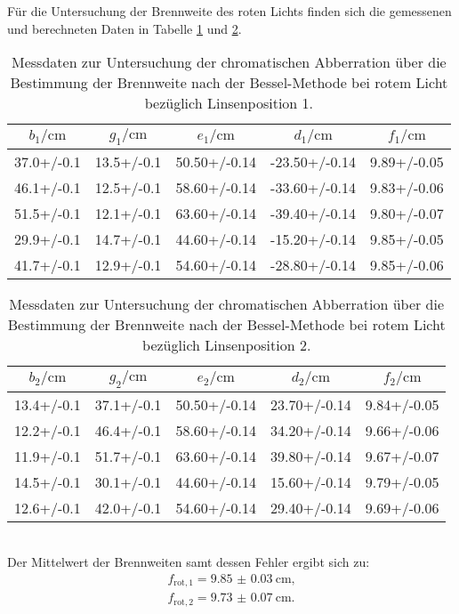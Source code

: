 Für die Untersuchung der Brennweite des roten Lichts finden sich die gemessenen und berechneten Daten in Tabelle \ref{tab:red} und \ref{tab:notblue}.
\begin{table}
  \caption{Messdaten zur Untersuchung der chromatischen Abberration über die Bestimmung der Brennweite nach der Bessel-Methode bei rotem Licht bezüglich Linsenposition 1.}
  \label{tab:red}
  \centering
\begin{tabular}{ccccc}
  \toprule
$b_\mathrm{1}/\si{\centi\meter}$ & $g_\mathrm{1}/\si{\centi\meter}$ & $e_\mathrm{1}/\si{\centi\meter}$ & $d_\mathrm{1}/\si{\centi\meter}$ & $f_\mathrm{1}/\si{\centi\meter}$ \\
\midrule
37.0+/-0.1 & 13.5+/-0.1 & 50.50+/-0.14 & -23.50+/-0.14 & 9.89+/-0.05 \\
46.1+/-0.1 & 12.5+/-0.1 & 58.60+/-0.14 & -33.60+/-0.14 & 9.83+/-0.06 \\
51.5+/-0.1 & 12.1+/-0.1 & 63.60+/-0.14 & -39.40+/-0.14 & 9.80+/-0.07 \\
29.9+/-0.1 & 14.7+/-0.1 & 44.60+/-0.14 & -15.20+/-0.14 & 9.85+/-0.05 \\
41.7+/-0.1 & 12.9+/-0.1 & 54.60+/-0.14 & -28.80+/-0.14 & 9.85+/-0.06 \\
\bottomrule
\end{tabular}
\end{table}
\begin{table}
\caption{Messdaten zur Untersuchung der chromatischen Abberration über die Bestimmung der Brennweite nach der Bessel-Methode bei rotem Licht bezüglich Linsenposition 2.}
  \label{tab:notblue}
  \centering
\begin{tabular}{ccccc}
  \toprule
$b_\mathrm{2}/\si{\centi\meter}$ & $g_\mathrm{2}/\si{\centi\meter}$ & $e_\mathrm{2}/\si{\centi\meter}$ & $d_\mathrm{2}/\si{\centi\meter}$ & $f_\mathrm{2}/\si{\centi\meter}$ \\
\midrule
13.4+/-0.1 & 37.1+/-0.1 & 50.50+/-0.14 & 23.70+/-0.14 & 9.84+/-0.05 \\
12.2+/-0.1 & 46.4+/-0.1 & 58.60+/-0.14 & 34.20+/-0.14 & 9.66+/-0.06 \\
11.9+/-0.1 & 51.7+/-0.1 & 63.60+/-0.14 & 39.80+/-0.14 & 9.67+/-0.07 \\
14.5+/-0.1 & 30.1+/-0.1 & 44.60+/-0.14 & 15.60+/-0.14 & 9.79+/-0.05 \\
12.6+/-0.1 & 42.0+/-0.1 & 54.60+/-0.14 & 29.40+/-0.14 & 9.69+/-0.06 \\
\bottomrule
\end{tabular}
\end{table}
\\Der Mittelwert der Brennweiten samt dessen Fehler ergibt sich zu:
\begin{gather*}
  f_\mathrm{rot, 1}= \SI{9.85(3)}{\centi\meter}\text{,}\\
  f_\mathrm{rot, 2}= \SI{9.73(7)}{\centi\meter}\text{.}
\end{gather*}



